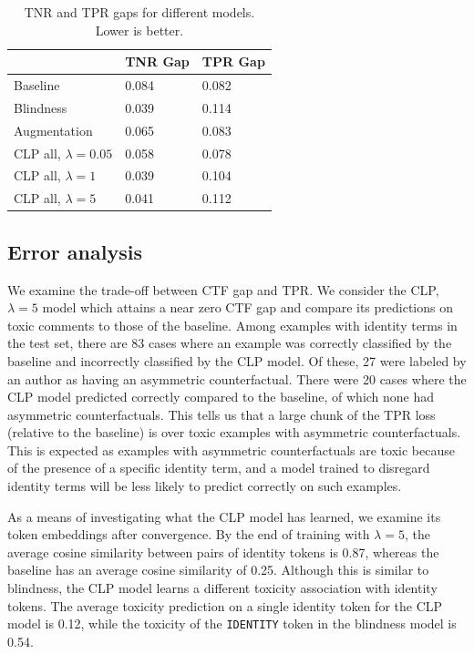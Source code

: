 \documentclass[letterpaper]{article} %
\newcommand{\identity}{\texttt{IDENTITY}\xspace}
\theoremstyle{definition}
\begin{document}
\begin{table}[]
\centering
\begin{tabular}{l|l|l|}
\cline{2-3}
                                              & TNR Gap & TPR Gap \\ \hline
\multicolumn{1}{|l|}{Baseline}                & 0.084      & 0.082      \\ \hline
\multicolumn{1}{|l|}{Blindness}               & 0.039      & 0.114      \\ \hline
\multicolumn{1}{|l|}{Augmentation}            & 0.065      & 0.083      \\ \hline
\multicolumn{1}{|l|}{CLP all, $\lambda=0.05$} & 0.058      & 0.078      \\ \hline
\multicolumn{1}{|l|}{CLP all, $\lambda=1$}    & 0.039      & 0.104      \\ \hline
\multicolumn{1}{|l|}{CLP all, $\lambda=5$}    & 0.041      & 0.112      \\ \hline
\end{tabular}
\caption{TNR and TPR gaps for different models. Lower is better.}\label{tab:eo}
\end{table}


\subsection{Error analysis}\label{sec:error}

We examine the trade-off between CTF gap and TPR. We consider the CLP, $\lambda=5$ model which attains a near zero CTF gap and compare its predictions on toxic comments to those of the baseline. Among examples with identity terms in the test set, there are 83 cases where an example was correctly classified by the baseline and incorrectly classified by the CLP model. Of these, 27 were labeled by an author as having an asymmetric counterfactual. There were 20 cases where the CLP model predicted correctly compared to the baseline, of which none had asymmetric counterfactuals. This tells us that a large chunk of the TPR loss (relative to the baseline) is over toxic examples with asymmetric counterfactuals.
This is expected as examples with asymmetric counterfactuals are toxic because of the presence of a specific identity term, and a model trained to disregard identity terms will be less likely to predict correctly on such examples. 

As a means of investigating what the CLP model has learned, we examine its token embeddings after convergence. By the end of training with $\lambda=5$, the average cosine similarity between pairs of identity tokens is 0.87, whereas the baseline has an average cosine similarity of 0.25. Although this is similar to blindness, the CLP model learns a different toxicity association with identity tokens. The average toxicity prediction on a single identity token for the CLP model is 0.12, while the toxicity of the \identity token in the blindness model is 0.54.
\end{document}
